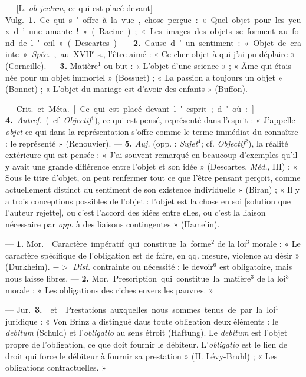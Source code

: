 \begin{itemize}[leftmargin=1cm, label=, itemsep=1pt]
 — [L. {\it ob-jectum}, ce qui est placé devant] — \si{Vulg.}
{\bf 1.} Ce qui s'offre à la vue, chose perçue : « Quel objet pour les yeux
d’une amante ! » (Racine) ; « Les images des objets se forment au fond de
l'œil » (Descartes). — {\bf 2.} Cause d’un sentiment : « Objet de crainte ».
{\it Spéc.}, au {\footnotesize XVII}$^\text{e}$ s., l'être aimé : « Ce cher
objet à qui j'ai pu déplaire » (Corneille). —  {\bf 3.} Matière$^1$ ou but :
« L'objet d’une science » ; « Âme qui étais née pour un objet
immortel » (Bossuet) ; « La passion a toujours un objet » (Bonnet) ;
« L'objet du mariage est d’avoir des enfants » (Buffon).

— \si{Crit.} et \si{Méta.} [Ce qui est placé devant l'esprit; d'où :]. {\bf
4.} {\it Autref.} (cf. {\it Objectif}$^1$), ce qui est pensé, représenté dans
l'esprit : « J’appelle {\it objet} ce qui dans la représentation s'offre
comme le terme immédiat du connaître : le représenté » (Renouvier). — {\bf
5.} {\it Auj.} (opp. : {\it Sujet}$^4$; cf. {\it Objectif}$^2$), la réalité
extérieure qui est pensée : « J’ai souvent remarqué en beaucoup d'exemples
qu'il y avait une grande diflérence entre l’objet et son idée » (Descartes,
{\it Méd.}, III) ; « Sous le titre d'objet, on peut renfermer tout ce que
l'être pensant perçoit, comme actuellement distinct du sentiment de son
existence individuelle » (Biran) ; « Il
y a trois conceptions possibles de l’objet : l'objet est la chose en soi
[solution que l’auteur rejette], ou c’est l’accord des idées entre elles, ou
c’est la liaison nécessaire par {\it opp.} à des liaisons
contingentes » (Hamelin).

 — {\bf 1.} \si{Mor.}  Caractère impératif qui
constitue la forme$^2$ de la loi$^3$ morale : « Le caractère spécifique de
l'obligation est de faire, en qq. mesure, violence au désir » (Durkheim). $->$
{\it Dist.} contrainte ou nécessité : le devoir$^6$ est obligatoire, mais
nous laisse libres. — {\bf 2.}  \si{Mor.} Prescription qui
constitue la matière$^3$ de la loi$^3$ morale : « Les obligations des riches
envers les pauvres. »

— \si{Jur.} {\bf 3.}  et  Prestations
auxquelles nous sommes tenus de par la loi$^1$ juridique : « Von Brinz a
distingué daus toute obligation deux éléments : le {\it debitum} (Schuld) et
l’{\it obligatio} au sens étroit (Haftung). Le {\it debitum} est l'objet
propre de l'obligation, ce que doit fournir le débiteur. L'{\it obligatio}
est le lien de droit qui force le débiteur à fournir sa prestation » (H.
Lévy-Bruhl) ; « Les obligations contractuelles. »


\end{itemize}
